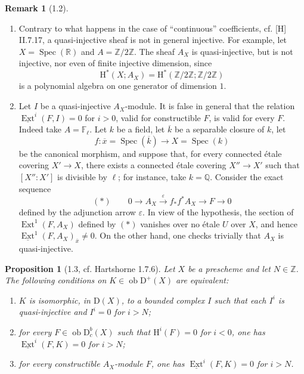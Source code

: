 \documentclass[11pt,a4paper]{article}
\newcommand{\Z}{\mathbb{Z}}
\newcommand{\F}{\mathbb{F}}
\newcommand{\R}{\mathbb{R}}
\newcommand{\ol}[1]{\overline{#1}}
\newcommand{\D}{\mathrm{D}}
\newcommand{\ob}{\operatorname{ob}}
\DeclareMathOperator{\Spec}{Spec}
\DeclareMathOperator{\Ext}{Ext}
\newcommand{\uExt}{\underline{\Ext}}
\theoremstyle{plain}
\newtheorem*{propositionstar}{Proposition}
\theoremstyle{definition}
\newtheorem*{remarkstar}{Remark}
\begin{document}
\begin{remarkstar}[1.2]
\begin{enumerate}[label=\alph*)]
\item Contrary to what happens in the case of ``continuous'' coefficients, cf. [H] II.7.17, a quasi-injective sheaf is not in general injective. For example, let $X=\Spec(\R)$ and $A=\Z/2\Z$. The sheaf $A_X$ is quasi-injective, but is not injective, nor even of finite injective dimension, since
\[
\mathrm H^*(X;A_X)=\mathrm H^*(\Z/2\Z;\Z/2\Z)
\]
is a polynomial algebra on one generator of dimension $1$.

\item Let $I$ be a quasi-injective $A_X$-module. It is false in general that the relation $\uExt^i(F,I)=0$ for $i>0$, valid for constructible $F$, is valid for every $F$. Indeed take $A=\F_\ell$. Let $k$ be a field, let $\ol{k}$ be a separable closure of $k$, let
\[
f:\ol{x}=\Spec(\ol{k})\longrightarrow X=\Spec(k)
\]
be the canonical morphism, and suppose that, for every connected étale covering $X'\to X$, there exists a connected étale covering $X''\to X'$ such that $[X'':X']$ is divisible by $\ell$; for instance, take $k=\mathbb Q$. Consider the exact sequence
\[
(*)\qquad 0\longrightarrow A_X\xrightarrow{\;\varepsilon\;} f_*f^*A_X\longrightarrow F\longrightarrow 0
\]
defined by the adjunction arrow $\varepsilon$. In view of the hypothesis, the section of $\Ext^1(F,A_X)$ defined by $(*)$ vanishes over no étale $U$ over $X$, and hence $\uExt^1(F,A_X)_{\ol{x}}\ne 0$. On the other hand, one checks trivially that $A_X$ is quasi-injective.
\end{enumerate}
\end{remarkstar}

\begin{propositionstar}[1.3, cf. Hartshorne 1.7.6]
Let $X$ be a prescheme and let $N\in\Z$. The following conditions on $K\in\ob\D^+(X)$ are equivalent:
\begin{enumerate}[label=(\roman*)]
\item $K$ is isomorphic, in $\D(X)$, to a bounded complex $I$ such that each $I^i$ is quasi-injective and $I^i=0$ for $i>N$;
\item for every $F\in\ob\D_c^b(X)$ such that $\mathrm H^i(F)=0$ for $i<0$, one has $\uExt^i(F,K)=0$ for $i>N$;
\item for every constructible $A_X$-module $F$, one has $\uExt^i(F,K)=0$ for $i>N$.
\end{enumerate}
\end{propositionstar}
\end{document}
